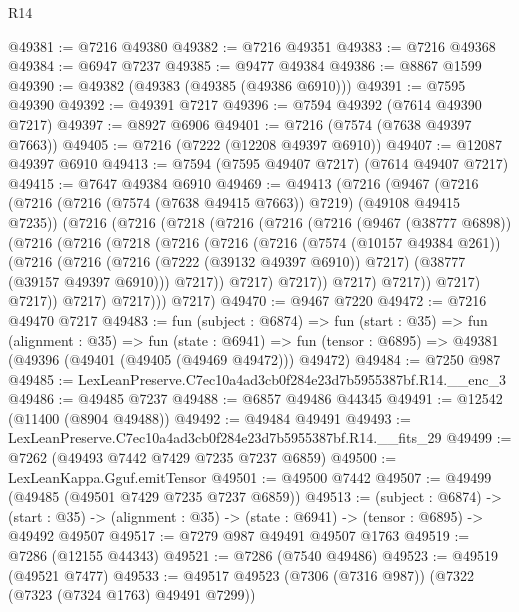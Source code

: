 \begin{lexlean}{R14}
\begin{coremodule}
@49381 := @7216 @49380
@49382 := @7216 @49351
@49383 := @7216 @49368
@49384 := @6947 @7237
@49385 := @9477 @49384
@49386 := @8867 @1599
@49390 := @49382 (@49383 (@49385 (@49386 @6910)))
@49391 := @7595 @49390
@49392 := @49391 @7217
@49396 := @7594 @49392 (@7614 @49390 @7217)
@49397 := @8927 @6906
@49401 := @7216 (@7574 (@7638 @49397 @7663))
@49405 := @7216 (@7222 (@12208 @49397 @6910))
@49407 := @12087 @49397 @6910
@49413 := @7594 (@7595 @49407 @7217) (@7614 @49407 @7217)
@49415 := @7647 @49384 @6910
@49469 := @49413
    (@7216
      (@9467
        (@7216
          (@7216 (@7216 (@7574 (@7638 @49415 @7663)) @7219) (@49108 @49415 @7235))
          (@7216
            (@7216
              (@7218
                (@7216
                  (@7216
                    (@7216
                      (@9467 (@38777 @6898))
                      (@7216
                        (@7216
                          (@7218
                            (@7216
                              (@7216
                                (@7216
                                  (@7574 (@10157 @49384 @261))
                                  (@7216
                                    (@7216
                                      (@7216 (@7222 (@39132 @49397 @6910)) @7217)
                                      (@38777 (@39157 @49397 @6910)))
                                    @7217))
                                @7217)
                              @7217))
                          @7217)
                        @7217))
                    @7217)
                  @7217))
              @7217)
            @7217)))
      @7217)
@49470 := @9467 @7220
@49472 := @7216 @49470 @7217
@49483 := fun (subject : @6874) =>
  fun (start : @35) =>
  fun (alignment : @35) =>
  fun (state : @6941) =>
  fun (tensor : @6895) => @49381 (@49396 (@49401 (@49405 (@49469 @49472))) @49472)
@49484 := @7250 @987
@49485 := LexLeanPreserve.C7ec10a4ad3cb0f284e23d7b5955387bf.R14.__enc_3
@49486 := @49485 @7237
@49488 := @6857 @49486 @44345
@49491 := @12542 (@11400 (@8904 @49488))
@49492 := @49484 @49491
@49493 := LexLeanPreserve.C7ec10a4ad3cb0f284e23d7b5955387bf.R14.__fits_29
@49499 := @7262 (@49493 @7442 @7429 @7235 @7237 @6859)
@49500 := LexLeanKappa.Gguf.emitTensor
@49501 := @49500 @7442
@49507 := @49499 (@49485 (@49501 @7429 @7235 @7237 @6859))
@49513 := (subject : @6874) ->
  (start : @35) -> (alignment : @35) -> (state : @6941) -> (tensor : @6895) -> @49492 @49507
@49517 := @7279 @987 @49491 @49507 @1763
@49519 := @7286 (@12155 @44343)
@49521 := @7286 (@7540 @49486)
@49523 := @49519 (@49521 @7477)
@49533 := @49517 @49523 (@7306 (@7316 @987)) (@7322 (@7323 (@7324 @1763) @49491 @7299))

\end{coremodule}
\end{lexlean}
